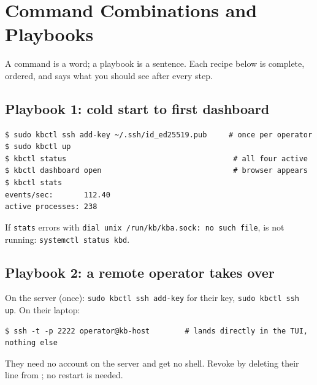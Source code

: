 \chapter{Command Combinations and Playbooks}
\label{ch:play}
A command is a word; a playbook is a sentence. Each recipe below is complete, ordered, and says what you
should see after every step.

\section{Playbook 1: cold start to first dashboard}
\begin{lstlisting}[style=console]
$ sudo kbctl ssh add-key ~/.ssh/id_ed25519.pub     # once per operator
$ sudo kbctl up
$ kbctl status                                      # all four active
$ kbctl dashboard open                              # browser appears
$ kbctl stats
events/sec:       112.40
active processes: 238
\end{lstlisting}
If \texttt{stats} errors with \texttt{dial unix /run/kb/kba.sock: no such file},  is not running:
\texttt{systemctl status kbd}.

\section{Playbook 2: a remote operator takes over}
On the server (once): \texttt{sudo kbctl ssh add-key} for their key, \texttt{sudo kbctl ssh up}.
On their laptop:
\begin{lstlisting}[style=console]
$ ssh -t -p 2222 operator@kb-host        # lands directly in the TUI, nothing else
\end{lstlisting}
They need no account on the server and get no shell. Revoke by deleting their line from
; no restart is needed.


